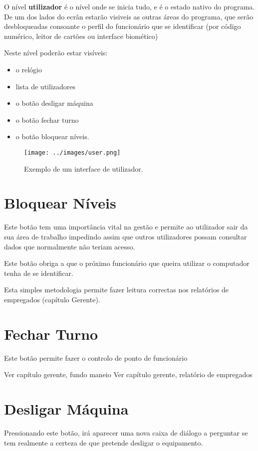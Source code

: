 \documentclass[a4paper,11pt,openany]{memoir}
\begin{document}
O nível \textbf{utilizador} é o nível onde se inicia tudo, e é o estado nativo do programa.
De um dos lados do ecrân estarão visiveis as outras áreas do programa, que serão desbloqueadas 
consoante o perfil do funcionário que se identificar (por código numérico, leitor de cartões ou interface biomético)

Neste nível poderão estar visíveis:
\begin{itemize}
\item o relógio
\item lista de utilizadores
\item o botão desligar máquina
\item o botão fechar turno
\item o botão bloquear níveis.
\end{itemize}
\begin{figure}
\texttt{[image: ../images/user.png]}
\caption[Submanifold]{Exemplo de um interface de utilizador.}
\end{figure}

\section{Bloquear Níveis}

Este botão tem uma importância vital na gestão e permite ao utilizador sair da sua área de trabalho
impedindo assim que outros utilizadores possam consultar dados que normalmente não teriam acesso.

Este botão obriga a que o próximo funcionário que queira utilizar o computador tenha de se identificar.

Esta simples metodologia permite fazer leitura correctas nos relatórios de empregados (capítulo Gerente).

\section{Fechar Turno}

Este botão permite fazer o controlo de ponto de funcionário

Ver capítulo gerente, fundo maneio
Ver capítulo gerente, relatório de empregados


\section{Desligar Máquina}

Pressionando este botão, irá aparecer uma nova caixa de diálogo a perguntar se tem realmente a certeza
de que pretende desligar o equipamento.
\end{document}
